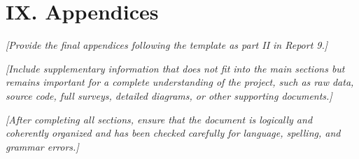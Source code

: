 \documentclass[11pt,a4paper]{article}
\newcommand{\guidance}[1]{%
  {\color{guidanceblue}\itshape [#1]\par}%
}
\newcommand{\chapterstart}[1]{\clearpage\section{#1}}
\begin{document}
\chapterstart{IX. Appendices}
\guidance{Provide the final appendices following the template as part II in
Report 9.}
\guidance{Include supplementary information that does not fit into the main
sections but remains important for a complete understanding of the project,
such as raw data, source code, full surveys, detailed diagrams, or other
supporting documents.}
\guidance{After completing all sections, ensure that the document is logically
and coherently organized and has been checked carefully for language,
spelling, and grammar errors.}
\end{document}
